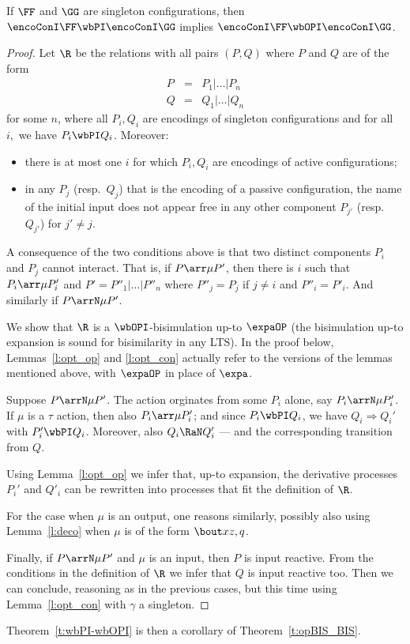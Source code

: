 \begin{theorem}
\label{t:opBIS_BIS}
If $\FF$ and $\GG$ are singleton configurations, then
$\encoConI  \FF \wbPI \encoConI  \GG $  implies 
 $\encoConI  \FF \wbOPI \encoConI  \GG $.
\end{theorem} 

\begin{proof}
Let $\R$ be the relations with all pairs $(P,Q)$ where $P$ and $Q$ are of the
form 
\[
\begin{array}{rcl}
 P &=&   %
P_1  | \ldots | P_n
\\
 Q &=& %
Q_1  | \ldots | Q_n
\end{array}
 \] 
for some $n$, where all $P_i,Q_i$ are 
encodings of singleton configurations and  for all $i, $ we have $P_i \wbPI Q_i$.
Moreover:
\begin{itemize}
\item
 there is at most one $i$ for which  $P_i,Q_i$ are encodings of  active
configurations;
\item  in any $P_j$ (resp.\ $Q_j$) that is the encoding of a passive
configuration, the name of the initial input does not appear free in any other component
$P_{j'}$ (resp.\ $Q_{j'}$) for $j'\neq j$. 
\end{itemize} 
\noindent
A consequence of the two conditions above is that two distinct components $P_i$ and $P_j$
cannot interact. That is, if $P \arr \mu P'$,  then there is $i$ such
that $P_i \arr \mu P'_i$ and $P' = P''_1| \ldots | P''_n$ where $P''_j = P_j $ if $j\neq i$
and $P''_i = P'_i $. And similarly if   $P \arrN \mu P'$.



We  show that  $\R$ is a  $\wbOPI$-bisimulation  up-to $\expaOP$ (the bisimulation
up-to expansion is sound for bisimilarity in any LTS). 
In the proof below,  Lemmas~\ref{l:opt_op}  and 
\ref{l:opt_con}
actually refer to the versions of the lemmas mentioned above, with $\expaOP$
in place of $\expa$.  


Suppose $P \arrN \mu P'$.  The action orginates from some $P_i$ alone, say $P_i \arrN\mu P_i'$.
If $\mu$ is a $\tau $ action, then also $P_i \arr\mu P_i'$; 
and since $P_i \wbPI Q_i$, we have $Q_i \Longrightarrow  Q_i'$ with $P_i' \wbPI Q_i$.  
Moreover, also $Q_i \RaN  Q_i'$ --- and the corresponding transition from $Q$.


Using Lemma~\ref{l:opt_op} we infer that, up-to expansion, the
derivative processes $P_i'$ and $Q'_i$ can be rewritten into processes
that fit the definition of $\R$. 

For the case when $\mu$ is an output, one reasons similarly, possibly
also using Lemma~\ref{l:deco} when $\mu $ is of the form $\bout x {z,q}$.  

Finally, if $P \arrN \mu P'$ and $\mu$ is an input, then $P $ is input
reactive. From the conditions in the definition of $\R$ we infer that
$Q$ is input reactive too.  Then we can conclude, reasoning as in the
previous cases, but this time  using Lemma~\ref{l:opt_con} with
$\gamma   $ a singleton.  
\end{proof}  
\noindent
Theorem~\ref{t:wbPI-wbOPI}  is then a corollary of
Theorem~\ref{t:opBIS_BIS}.  


